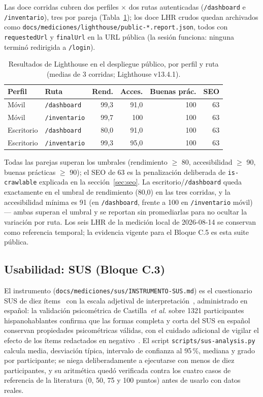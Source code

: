 \documentclass[11pt,a4paper]{article}
\newcommand{\ruta}[1]{\texttt{\footnotesize #1}}
\begin{document}
Las doce corridas cubren dos perfiles $\times$ dos rutas autenticadas
(\texttt{/dashboard} e \texttt{/inventario}), tres por pareja
(Tabla~\ref{tab:lighthouse-public}); los doce LHR crudos quedan
archivados como \texttt{docs/mediciones/lighthouse/public-*.report.json},
todos con \texttt{requestedUrl} y \texttt{finalUrl} en la URL pública
(la sesión funciona: ninguna terminó redirigida a \texttt{/login}).

\begin{table}[htbp]
\centering
\caption{Resultados de Lighthouse en el despliegue público, por perfil y ruta (medias de 3 corridas; Lighthouse v13.4.1).}
\label{tab:lighthouse-public}
\begin{tabular}{@{}llrrrr@{}}
\toprule
\textbf{Perfil} & \textbf{Ruta} & \textbf{Rend.} & \textbf{Acces.} & \textbf{Buenas prác.} & \textbf{SEO} \\
\midrule
Móvil & \texttt{/dashboard}  & 99,3 & 91,0 & 100 & 63 \\
Móvil & \texttt{/inventario} & 99,7 & 100 & 100 & 63 \\
Escritorio & \texttt{/dashboard}  & 80,0 & 91,0 & 100 & 63 \\
Escritorio & \texttt{/inventario} & 99,3 & 95,0 & 100 & 63 \\
\bottomrule
\end{tabular}
\end{table}

Todas las parejas superan los umbrales (rendimiento $\geq$ 80,
accesibilidad $\geq$ 90, buenas prácticas $\geq$ 90); el SEO de 63 es
la penalización deliberada de \texttt{is-crawlable} explicada en la
sección~\ref{sec:seo}. La escritorio/\texttt{/dashboard} queda exactamente en
el umbral de rendimiento (80,0) en las tres corridas, y la
accesibilidad mínima es 91 (en \texttt{/dashboard}, frente a 100 en
\texttt{/inventario} móvil) — ambas superan el umbral y se reportan sin
promediarlas para no ocultar la variación por ruta. Los seis LHR de la
medición local de 2026-08-14 se conservan como referencia temporal; la
evidencia vigente para el Bloque C.5 es esta suite pública.

\subsection{Usabilidad: SUS (Bloque C.3)}
\label{sec:sus}

El instrumento (\ruta{docs/mediciones/sus/INSTRUMENTO-SUS.md}) es el
cuestionario SUS de diez ítems~\cite{brooke1996} con la escala adjetival de
interpretación~\cite{bangor2009}, administrado en español: la validación
psicométrica de Castilla~\emph{et al.} sobre 1321 participantes hispanohablantes
confirma que las formas completa y corta del SUS en español conservan
propiedades psicométricas válidas, con el cuidado adicional de vigilar el
efecto de los ítems redactados en negativo~\cite{castilla2023sus}. El script
\ruta{scripts/sus-analysis.py}
calcula media, desviación típica, intervalo de confianza al 95\,\%, mediana
y grado por participante; se niega deliberadamente a ejecutarse con menos
de diez participantes, y su aritmética quedó verificada contra los cuatro
casos de referencia de la literatura (0, 50, 75 y 100 puntos) antes de
usarlo con datos reales.
\end{document}
